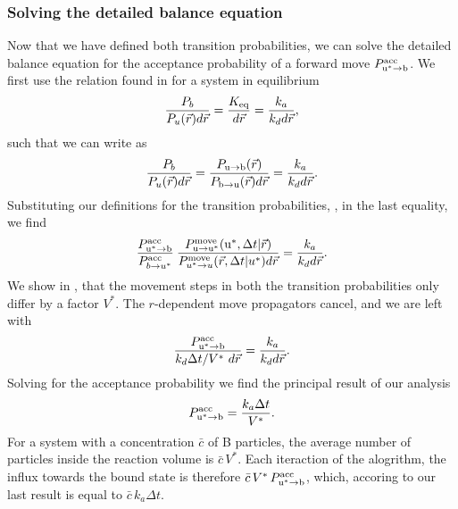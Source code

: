 \subsubsection{Solving the detailed balance equation}
Now that we have defined both transition probabilities, we can solve the detailed balance equation for the acceptance probability of a forward move $P^{\rm acc}_{{\rm u}^* \to {\rm b}}$. We first use the relation found in \cite{Morelli2008a} for a system in equilibrium
\begin{equation}
 \frac{P_b}{P_u(\vec{r})d\vec{r}} = \frac{K_{\rm eq}}{d\vec{r}} = \frac{k_a}{k_d d\vec{r}},
\end{equation}
such that we can write  as
\begin{equation}
 \frac{P_b}{P_u(\vec{r})d\vec{r}} = \frac{P_{ \rm{u} \to \rm{b} }(\vec{r})}{P_{ \rm{b} \to \rm{u} }(\vec{r})d\vec{r}} = \frac{k_a}{k_d d\vec{r}}.
\end{equation}
Substituting our definitions for the transition probabilities, , in the last equality, we find
\begin{equation}
 \frac{P^{\rm acc}_{{\rm u}^* \to {\rm b}}}{P^{\rm acc}_{b \to u^*}} \: \frac{P^{\rm move}_{{\rm u} \to {\rm u}^*}({\rm u}^*,\Delta t|\vec{r})}{P^{\rm move}_{u^* \to u}(\vec{r},\Delta t|u^*)d\vec{r}} = \frac{k_a}{k_d d\vec{r}}.
\end{equation}
We show in , that the movement steps in both the transition probabilities only differ by a factor $V^*$. The $r$-dependent move propagators cancel, and we are left with
\begin{equation}
 \frac{P^{\rm acc}_{{\rm u}^* \to {\rm b}}}{k_d \Delta t/V^* \,\, d\vec{r}} = \frac{k_a}{k_d d\vec{r}}.
\elabel{semi-pivotal}
\end{equation}
Solving for the acceptance probability we find the principal result of our analysis
\begin{equation}
 P^{\rm acc}_{{\rm u}^* \to {\rm b}} = \frac{k_a \Delta t}{V^*}.
\elabel{pivotal}
\end{equation}
For a system with a concentration $\bar{c}$ of B particles, the average number of particles inside the reaction volume is $\bar{c}\,V^*$. Each iteraction of the alogrithm, the influx towards the bound state is therefore $\bar{c}\,V^*\,P^{\rm acc}_{{\rm u}^* \to {\rm b}}$, which, accoring to our last result is equal to $\bar{c}\,k_a \Delta t$. 

